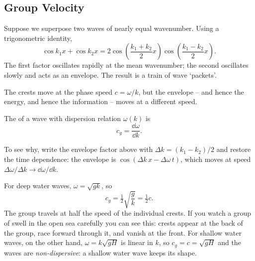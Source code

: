 \subsection{Group Velocity}

Suppose we superpose two waves of nearly equal wavenumber. Using a trigonometric identity,
$$
\cos k_1 x + \cos k_2 x = 2\cos\left(\frac{k_1 + k_2}{2}x\right)\cos\left(\frac{k_1 - k_2}{2}x\right).
$$
The first factor oscillates rapidly at the mean wavenumber; the second oscillates slowly and acts as an envelope. The result is a train of wave `packets'.

\begin{center}
\end{center}

The crests move at the phase speed $c = \omega/k$, but the envelope -- and hence the energy, and hence the information -- moves at a different speed.

\begin{definition}
	The  of a wave with dispersion relation $\omega(k)$ is
	$$
	c_g = \frac{\dd \omega}{\dd k}.
	$$
\end{definition}

To see why, write the envelope factor above with $\Delta k = (k_1 - k_2)/2$ and restore the time dependence: the envelope is $\cos(\Delta k \, x - \Delta\omega\, t)$, which moves at speed $\Delta\omega/\Delta k \to \dd\omega/\dd k$.

For deep water waves, $\omega = \sqrt{gk}$, so
$$
c_g = \tfrac{1}{2}\sqrt{\frac{g}{k}} = \tfrac{1}{2}c.
$$
The group travels at half the speed of the individual crests. If you watch a group of swell in the open sea carefully you can see this: crests appear at the back of the group, race forward through it, and vanish at the front. For shallow water waves, on the other hand, $\omega = k\sqrt{gH}$ is linear in $k$, so $c_g = c = \sqrt{gH}$ and the waves are \emph{non-dispersive}: a shallow water wave keeps its shape.

